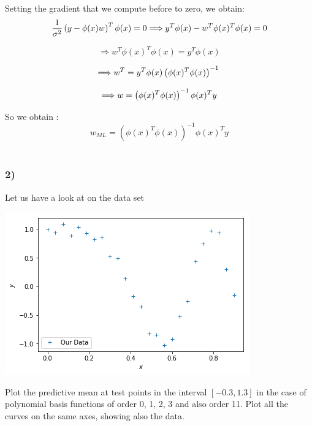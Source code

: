 \documentclass[12pt,twoside]{article}
\begin{document}
Setting the gradient that we compute before to zero, we obtain:
\begin{equation*}
\frac{1}{\sigma^2}  \left(y - \phi(x)w\right)^T \phi(x) = 0 \\
\Longrightarrow  y^T\phi(x) - w^T\phi(x)^T\phi(x) = 0
\end{equation*}

\begin{equation*}
\Longrightarrow   w^T\phi(x)^T\phi(x) = y^T\phi(x)
\end{equation*}

\begin{equation*}
\Longrightarrow   w^T = y^T\phi(x) \left(\phi(x)^T\phi(x)\right)^{-1} \\
\end{equation*}

\begin{equation*}
\Longrightarrow   w = \left(\phi(x)^T\phi(x)\right)^{-1}\phi(x)^Ty  \\
\end{equation*}

So we obtain :
\begin{equation}
\boxed{  w_{ML} = \left(\phi(x)^T\phi(x)\right)^{-1}\phi(x)^Ty  }
\end{equation}
\\
\subsubsection*{2)} Let us have a look at on the data set
\begin{center}
	\includegraphics{../data}	     
\end{center}



Plot the predictive mean at test points in the interval $[−0.3, 1.3]$ in
the case of polynomial basis functions of order 0, 1, 2, 3 and also order 11. Plot all the curves on the same axes, showing also the data.
\end{document}
